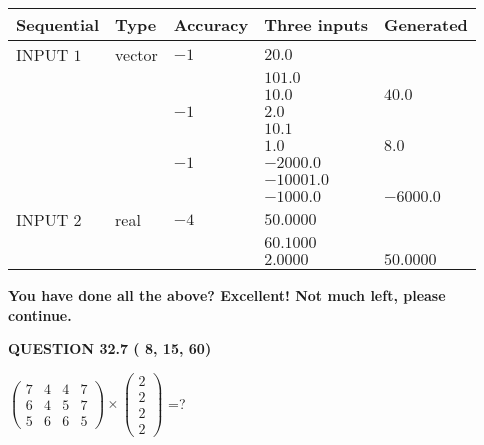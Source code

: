 \documentclass[12pt]{article}
\begin{document}
   
  
  
\noindent\begin{tabular}{|l|l|l|l|l|}
\hline
 Sequential & Type & Accuracy & Three inputs & Generated \\ 
\hline
 
 
  INPUT $           1$ & vector & $          -1 $ & $
20.0
  $ & \\
  & & & $
101.0
  $ & \\
  & & & $
10.0
$ & $ 40.0 $ 
  \\
  & & $          -1 $ & $
2.0
  $ & \\
  & & & $
10.1
  $ & \\
  & & & $
1.0
$ & $ 8.0 $ 
  \\
  & & $          -1 $ & $
-2000.0
  $ & \\
  & & & $
-10001.0
  $ & \\
  & & & $
-1000.0
$ & $ -6000.0 $ 
 \\  \hline  
 
 
  INPUT $           2$ & real & $          -4 $ & $
 50.0000
  $ & \\
  & & &  $
 60.1000
  $ & \\
  & & &  $
 2.0000
 $ & $ 50.0000 $ 
 \\  \hline  
 \end{tabular}
   
   
   
   
\vspace{0.3in}
{\textbf{\LARGE{You have done all the above? Excellent! Not much left, please continue.}}}
\vspace{0.3in}
   
   
  
\vspace{0.2in}
  
{\textbf{\Large{QUESTION
32.7 
 (          8,         15,         60)
}}}
  
  
 
$ \left( \begin{array}{ccccccccc}
           7 & 
           4 & 
           4 & 
           7 \\ 
           6 & 
           4 & 
           5 & 
           7 \\ 
           5 & 
           6 & 
           6 & 
           5
\end{array}\right) \times
\left( \begin{array}{c}
           2 \\ 
           2 \\ 
           2 \\ 
           2
\end{array}\right) $ =?
 
\end{document}
